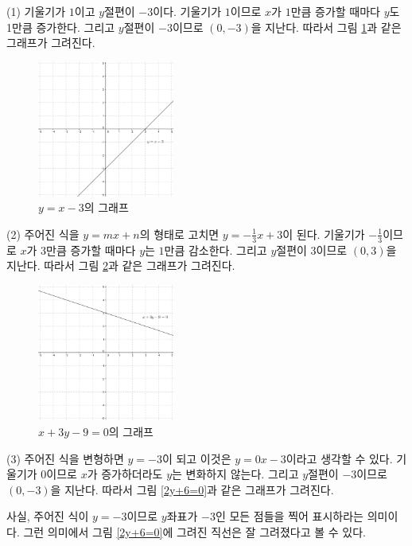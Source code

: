 \documentclass{article}
\newcommand{\sol}{\par\bigskip\noindent{\bfseries풀이)}\par}
\begin{document}
\sol
(1)
기울기가 \(1\)이고 \(y\)절편이 \(-3\)이다.
기울기가 \(1\)이므로 \(x\)가 \(1\)만큼 증가할 때마다 \(y\)도 1만큼 증가한다.
그리고 \(y\)절편이 \(-3\)이므로 \((0,-3)\)을 지난다.
따라서 그림 \ref{y=x-3}과 같은 그래프가 그려진다.

\begin{figure}[h!]
\center
\includegraphics[width=0.4\textwidth]{y=x-3}
\caption{\(y=x-3\)의 그래프}
\label{y=x-3}
\end{figure}

(2)
주어진 식을 \(y=mx+n\)의 형태로 고치면 \(y=-\frac13x+3\)이 된다.
기울기가 \(-\frac13\)이므로 \(x\)가 \(3\)만큼 증가할 때마다 \(y\)는 \(1\)만큼 감소한다.
그리고 \(y\)절편이 \(3\)이므로 \((0,3)\)을 지난다.
따라서 그림 \ref{x+3y-9=0}과 같은 그래프가 그려진다.

\begin{figure}[h!]
\center
\includegraphics[width=0.4\textwidth]{x+3y-9=0}
\caption{\(x+3y-9=0\)의 그래프}
\label{x+3y-9=0}
\end{figure}

(3)
주어진 식을 변형하면 \(y=-3\)이 되고 이것은 \(y=0x-3\)이라고 생각할 수 있다.
기울기가 \(0\)이므로 \(x\)가 증가하더라도 \(y\)는 변화하지 않는다.
그리고 \(y\)절편이 \(-3\)이므로 \((0,-3)\)을 지난다.
따라서 그림 \ref{2y+6=0}과 같은 그래프가 그려진다.

사실, 주어진 식이 \(y=-3\)이므로 \(y\)좌표가 \(-3\)인 모든 점들을 찍어 표시하라는 의미이다.
그런 의미에서 그림 \ref{2y+6=0}에 그려진 직선은 잘 그려졌다고 볼 수 있다.
\end{document}
